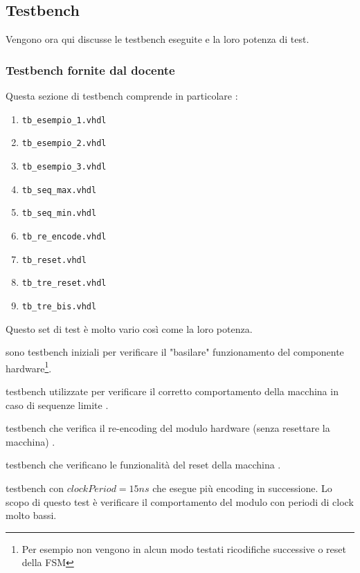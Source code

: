 \documentclass[11pt,a4paper]{article}
\begin{document}
        \subsection{Testbench}
                Vengono ora qui discusse le testbench eseguite e la loro potenza di test.
                    \subsubsection{Testbench fornite dal docente} \label{cap:test_bench_docente}
                        Questa sezione di testbench comprende in particolare :
                        \begin{enumerate}
                            \item \texttt{tb\_esempio\_1.vhdl}
                            \item \texttt{tb\_esempio\_2.vhdl}
                            \item \texttt{tb\_esempio\_3.vhdl}
                            \item \texttt{tb\_seq\_max.vhdl}
                            \item \texttt{tb\_seq\_min.vhdl}
                            \item \texttt{tb\_re\_encode.vhdl}
                            \item \texttt{tb\_reset.vhdl}
                            \item \texttt{tb\_tre\_reset.vhdl}
                            \item \texttt{tb\_tre\_bis.vhdl}
                        \end{enumerate}
                        Questo set di test è molto vario così come la loro potenza.
                        \begin{description}[leftmargin = 0cm]
                            \item[Test 1, 2 e 3 : ] sono testbench iniziali per verificare il "basilare" funzionamento del componente hardware\footnote[1]{Per esempio non vengono in alcun modo testati ricodifiche successive o reset della FSM}. 
                            \item[Test 4 e 5 : ] testbench utilizzate per verificare il corretto comportamento della macchina in caso di sequenze limite .
                            \item[Test 6 : ] testbench che verifica il re-encoding del modulo hardware (senza resettare la macchina) .
                            \item[Test 7 e 8 : ] testbench che verificano le funzionalità del reset della macchina .
                            \item[Test 9 : ] testbench con $clockPeriod = 15ns$ che esegue più encoding in successione. Lo scopo di questo test è verificare il comportamento del modulo con periodi di clock molto bassi. 
                        \end{description} 
\end{document}
